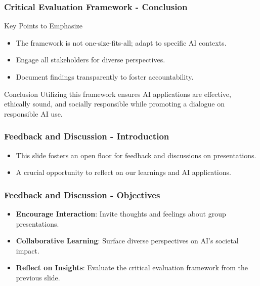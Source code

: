 \documentclass[aspectratio=169]{beamer}
\begin{document}
\begin{frame}[fragile]
    \frametitle{Critical Evaluation Framework - Conclusion}
    \begin{block}{Key Points to Emphasize}
        \begin{itemize}
            \item The framework is not one-size-fits-all; adapt to specific AI contexts.
            \item Engage all stakeholders for diverse perspectives.
            \item Document findings transparently to foster accountability.
        \end{itemize}
    \end{block}
    \begin{block}{Conclusion}
        Utilizing this framework ensures AI applications are effective, ethically sound, and socially responsible while promoting a dialogue on responsible AI use.
    \end{block}
\end{frame}

\begin{frame}[fragile]
    \frametitle{Feedback and Discussion - Introduction}
    \begin{itemize}
        \item This slide fosters an open floor for feedback and discussions on presentations.
        \item A crucial opportunity to reflect on our learnings and AI applications.
    \end{itemize}
\end{frame}

\begin{frame}[fragile]
    \frametitle{Feedback and Discussion - Objectives}
    \begin{itemize}
        \item \textbf{Encourage Interaction}: Invite thoughts and feelings about group presentations.
        \item \textbf{Collaborative Learning}: Surface diverse perspectives on AI's societal impact.
        \item \textbf{Reflect on Insights}: Evaluate the critical evaluation framework from the previous slide.
    \end{itemize}
\end{frame}
\end{document}
